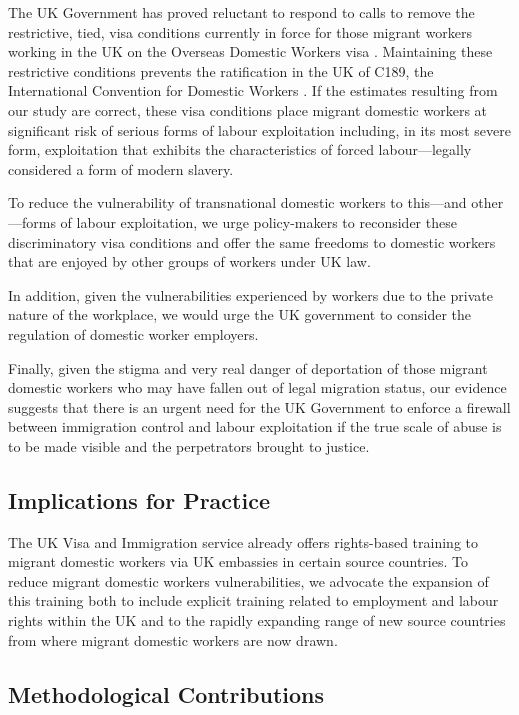 \documentclass[
  12pt,
  letterpaper,
  DIV=11,
  numbers=noendperiod]{scrartcl}
\theoremstyle{plain}
\theoremstyle{definition}
\begin{document}
The UK Government has proved reluctant to respond to calls to remove the
restrictive, tied, visa conditions currently in force for those migrant
workers working in the UK on the Overseas Domestic Workers visa
\autocite{gower_calls_2016}. Maintaining these restrictive conditions
prevents the ratification in the UK of C189, the International
Convention for Domestic Workers \autocite{ILO11-indicators}. If the
estimates resulting from our study are correct, these visa conditions
place migrant domestic workers at significant risk of serious forms of
labour exploitation including, in its most severe form, exploitation
that exhibits the characteristics of forced labour---legally considered
a form of modern slavery.

To reduce the vulnerability of transnational domestic workers to
this---and other---forms of labour exploitation, we urge policy-makers
to reconsider these discriminatory visa conditions and offer the same
freedoms to domestic workers that are enjoyed by other groups of workers
under UK law.

In addition, given the vulnerabilities experienced by workers due to the
private nature of the workplace, we would urge the UK government to
consider the regulation of domestic worker employers.

Finally, given the stigma and very real danger of deportation of those
migrant domestic workers who may have fallen out of legal migration
status, our evidence suggests that there is an urgent need for the UK
Government to enforce a firewall between immigration control and labour
exploitation if the true scale of abuse is to be made visible and the
perpetrators brought to justice.

\subsection{Implications for Practice}\label{implications-for-practice}

The UK Visa and Immigration service already offers rights-based training
to migrant domestic workers via UK embassies in certain source
countries. To reduce migrant domestic workers vulnerabilities, we
advocate the expansion of this training both to include explicit
training related to employment and labour rights within the UK and to
the rapidly expanding range of new source countries from where migrant
domestic workers are now drawn.

\subsection{Methodological
Contributions}\label{methodological-contributions}
\end{document}
